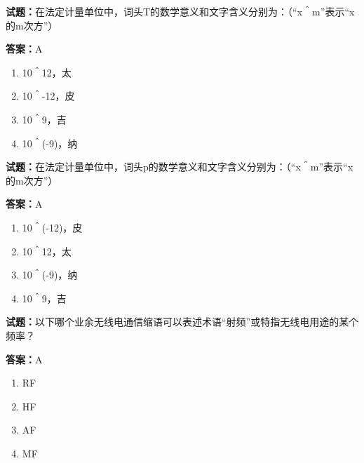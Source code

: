 \documentclass{ctexbook}
\begin{document}





\vspace{1em}

\textbf{试题：}在法定计量单位中，词头T的数学意义和文字含义分别为：（“x＾m”表示“x的m次方”） 

\textbf{答案：}A 

\begin{enumerate}[leftmargin=3em]
  \item 10＾12，太 

  \item 10＾-12，皮 

  \item 10＾9，吉 

  \item 10＾(-9)，纳 

\end{enumerate}





\vspace{1em}

\textbf{试题：}在法定计量单位中，词头p的数学意义和文字含义分别为：（“x＾m”表示“x的m次方”） 

\textbf{答案：}A 

\begin{enumerate}[leftmargin=3em]
  \item 10＾(-12)，皮 

  \item 10＾12，太 

  \item 10＾(-9)，纳 

  \item 10＾9，吉 

\end{enumerate}





\vspace{1em}

\textbf{试题：}以下哪个业余无线电通信缩语可以表述术语“射频”或特指无线电用途的某个频率？ 

\textbf{答案：}A 

\begin{enumerate}[leftmargin=3em]
  \item RF 

  \item HF 

  \item AF 

  \item MF 

\end{enumerate}
\end{document}
